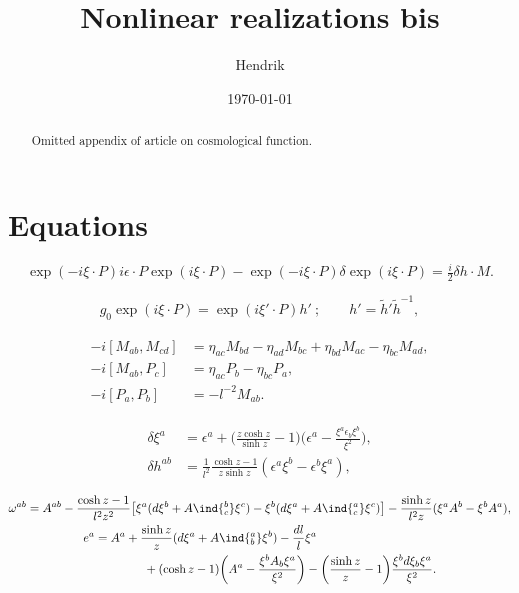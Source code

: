 \documentclass[11pt]{article}
\title{Nonlinear realizations bis}
\author{Hendrik}
\date{\today}
\begin{document}
\maketitle

\begin{abstract}
	Omitted appendix of article on cosmological function.
\end{abstract}

\section{Equations}

\begin{equation}
	\label{eq:nonlin_trafo_inf}
	\exp(-i\xi\cdot P) i\epsilon\cdot P \exp(i\xi\cdot P) - 
	\exp(-i\xi\cdot P) \delta\!\exp(i\xi\cdot P) = \tfrac{i}{2} 
	\delta h \cdot M.
\end{equation}

\begin{equation}\label{eq:left_action_group}
	g_0 \exp(i\xi\cdot P) = \exp(i\xi'\cdot P)h'~;
	\qquad
	h' = \tilde{h}'\tilde{h}^{-1},
\end{equation}

\begin{gather}
\label{eq:comm_relations_so(1,4)}
\begin{aligned}
	-i[M_{ab},M_{cd}] &= \eta_{ac}M_{bd} - \eta_{ad}M_{bc} + 
	\eta_{bd}M_{ac} - \eta_{bc}M_{ad}, \\
	-i[M_{ab},P_c] &= \eta_{ac}P_b- \eta_{bc}P_a, \\
	-i[P_a,P_b] &= -l^{-2}M_{ab}.
  \end{aligned}
\end{gather}

\begin{align}
	\label{eq:inf_tr_xi}
	\delta\xi^a &= \epsilon^a + \Big(\frac{z\cosh z}{\sinh z} - 
	1\Big) \bigg(\epsilon^a - \frac{\xi^a \epsilon_b 
		\xi^b}{\xi^2}\bigg), \\
	\label{eq:inf_tr_h}
	\delta h^{ab} &= \frac{1}{l^2} \frac{\cosh z - 1}{z\sinh z} 
	(\epsilon^a\xi^b - \epsilon^b\xi^a),
\end{align}

\begin{subequations}
\label{eqs:nonlin_spin_vier}
\begin{gather}
\label{eq:nonlin_spinconn}
	\omega^{ab} = A^{ab} - \frac{\cosh z - 1}{l^2 z^2} \big[ \xi^a 
	(d\xi^b + A\ind{^b_c} \xi^c) - \xi^b (d\xi^a + A\ind{^a_c} 
	\xi^c) \big] - \frac{\sinh z}{l^2 z} (\xi^a A^b - \xi^b A^a),
\\
\begin{multlined}[b][0.851\linewidth]
\label{eq:nonlin_vierbein}
	e^a = A^a + \frac{\sinh z}{z}( d\xi^a + A\ind{^a_b} \xi^b) - 
	\frac{dl}{l} \xi ^a \\
	+ (\cosh z - 1) \bigg( A^a - \frac{\xi^b A_b \xi^a}{\xi^2} 
	\bigg) - \bigg( \frac{\sinh z}{z} - 1 \bigg) \frac{\xi^b 
		d\xi_b \xi^a}{\xi^2}.
\end{multlined}
\end{gather}
\end{subequations}
\end{document}
